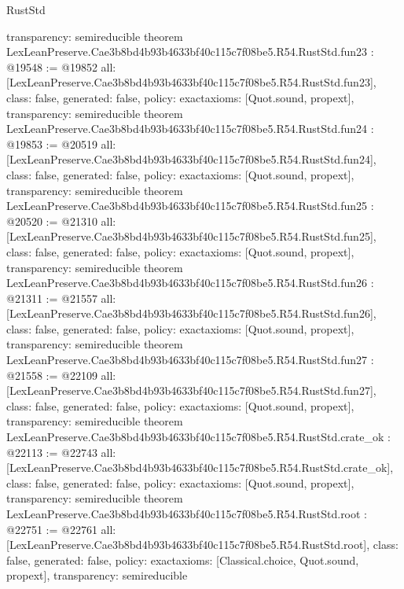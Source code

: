 \begin{lexlean}{RustStd}
\begin{coremodule}
{  transparency: semireducible
}
theorem LexLeanPreserve.Cae3b8bd4b93b4633bf40c115c7f08be5.R54.RustStd.fun23 : @19548 := @19852 {
  all: [LexLeanPreserve.Cae3b8bd4b93b4633bf40c115c7f08be5.R54.RustStd.fun23],
  class: false,
  generated: false,
  policy: exact{axioms: [Quot.sound, propext]},
  transparency: semireducible
}
theorem LexLeanPreserve.Cae3b8bd4b93b4633bf40c115c7f08be5.R54.RustStd.fun24 : @19853 := @20519 {
  all: [LexLeanPreserve.Cae3b8bd4b93b4633bf40c115c7f08be5.R54.RustStd.fun24],
  class: false,
  generated: false,
  policy: exact{axioms: [Quot.sound, propext]},
  transparency: semireducible
}
theorem LexLeanPreserve.Cae3b8bd4b93b4633bf40c115c7f08be5.R54.RustStd.fun25 : @20520 := @21310 {
  all: [LexLeanPreserve.Cae3b8bd4b93b4633bf40c115c7f08be5.R54.RustStd.fun25],
  class: false,
  generated: false,
  policy: exact{axioms: [Quot.sound, propext]},
  transparency: semireducible
}
theorem LexLeanPreserve.Cae3b8bd4b93b4633bf40c115c7f08be5.R54.RustStd.fun26 : @21311 := @21557 {
  all: [LexLeanPreserve.Cae3b8bd4b93b4633bf40c115c7f08be5.R54.RustStd.fun26],
  class: false,
  generated: false,
  policy: exact{axioms: [Quot.sound, propext]},
  transparency: semireducible
}
theorem LexLeanPreserve.Cae3b8bd4b93b4633bf40c115c7f08be5.R54.RustStd.fun27 : @21558 := @22109 {
  all: [LexLeanPreserve.Cae3b8bd4b93b4633bf40c115c7f08be5.R54.RustStd.fun27],
  class: false,
  generated: false,
  policy: exact{axioms: [Quot.sound, propext]},
  transparency: semireducible
}
theorem LexLeanPreserve.Cae3b8bd4b93b4633bf40c115c7f08be5.R54.RustStd.crate_ok : @22113 := @22743 {
  all: [LexLeanPreserve.Cae3b8bd4b93b4633bf40c115c7f08be5.R54.RustStd.crate_ok],
  class: false,
  generated: false,
  policy: exact{axioms: [Quot.sound, propext]},
  transparency: semireducible
}
theorem LexLeanPreserve.Cae3b8bd4b93b4633bf40c115c7f08be5.R54.RustStd.root : @22751 := @22761 {
  all: [LexLeanPreserve.Cae3b8bd4b93b4633bf40c115c7f08be5.R54.RustStd.root],
  class: false,
  generated: false,
  policy: exact{axioms: [Classical.choice, Quot.sound, propext]},
  transparency: semireducible
}


\end{coremodule}
\end{lexlean}
